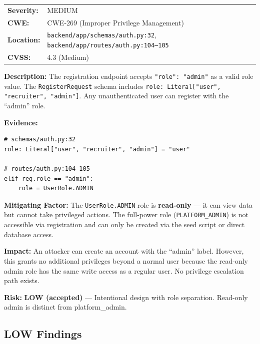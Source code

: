 \documentclass[11pt,a4paper]{article}
\begin{document}
\begin{tcolorbox}[colback=medium!5, colframe=medium, title=\textbf{S-01: Admin Role Available in Self-Registration}]
\begin{tabularx}{\textwidth}{lX}
\textbf{Severity:} & \textcolor{medium}{MEDIUM} \\
\textbf{CWE:} & CWE-269 (Improper Privilege Management) \\
\textbf{Location:} & \texttt{backend/app/schemas/auth.py:32}, \texttt{backend/app/routes/auth.py:104--105} \\
\textbf{CVSS:} & 4.3 (Medium) \\
\end{tabularx}

\textbf{Description:} The registration endpoint accepts \texttt{"role": "admin"} as a valid role value. The \texttt{RegisterRequest} schema includes \texttt{role: Literal["user", "recruiter", "admin"]}. Any unauthenticated user can register with the ``admin'' role.

\textbf{Evidence:}
\begin{verbatim}
# schemas/auth.py:32
role: Literal["user", "recruiter", "admin"] = "user"

# routes/auth.py:104-105
elif req.role == "admin":
    role = UserRole.ADMIN
\end{verbatim}

\textbf{Mitigating Factor:} The \texttt{UserRole.ADMIN} role is \textbf{read-only} --- it can view data but cannot take privileged actions. The full-power role (\texttt{PLATFORM\_ADMIN}) is not accessible via registration and can only be created via the seed script or direct database access.

\textbf{Impact:} An attacker can create an account with the ``admin'' label. However, this grants no additional privileges beyond a normal user because the read-only admin role has the same write access as a regular user. No privilege escalation path exists.

\textbf{Risk:} \textcolor{medium}{\textbf{LOW (accepted)}} --- Intentional design with role separation. Read-only admin is distinct from platform\_admin.
\end{tcolorbox}

\subsection{LOW Findings}
\end{document}

